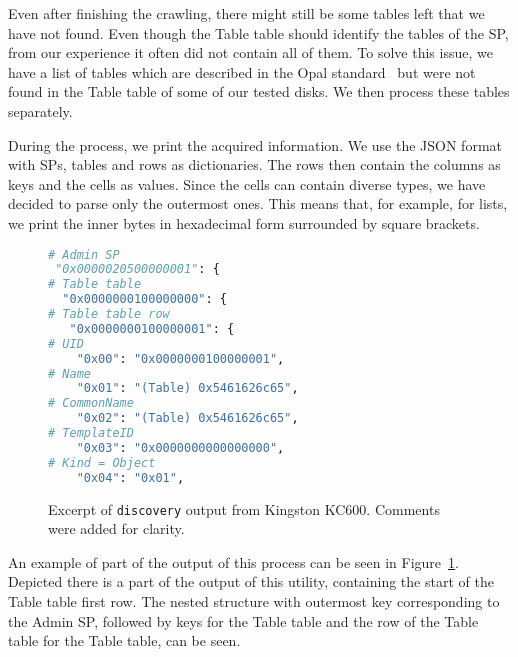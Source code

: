 Even after finishing the crawling, there might still be some tables left that we have not found. Even though the Table table should identify the tables of the SP, from our experience it often did not contain all of them. To solve this issue, we have a list of tables which are described in the Opal standard~\cite{tcg-opal2} but were not found in the Table table of some of our tested disks. We then process these tables separately.

During the process, we print the acquired information. We use the JSON format with SPs, tables and rows as dictionaries. The rows then contain the columns as keys and the cells as values. Since the cells can contain diverse types, we have decided to 
parse only the outermost ones. This means that, for example, for lists, we print the inner bytes in hexadecimal form surrounded by square brackets.

\begin{figure}
    \centering
\begin{lstlisting}[language=Python]
# Admin SP
 "0x0000020500000001": {
# Table table
  "0x0000000100000000": {
# Table table row
   "0x0000000100000001": {
# UID
    "0x00": "0x0000000100000001",
# Name
    "0x01": "(Table) 0x5461626c65",
# CommonName
    "0x02": "(Table) 0x5461626c65",
# TemplateID
    "0x03": "0x0000000000000000",
# Kind = Object
    "0x04": "0x01",
\end{lstlisting}

    \caption{Excerpt of \texttt{discovery} output from Kingston KC600. Comments were added for clarity.}
    \label{fig:discovery_example}
\end{figure}

An example of part of the output of this process can be seen in Figure~\ref{fig:discovery_example}. Depicted there is a part of the output of this utility, containing the start of the Table table first row. The nested structure with outermost key corresponding to the Admin SP, followed by keys for the Table table and the row of the Table table for the Table table, can be seen. %

